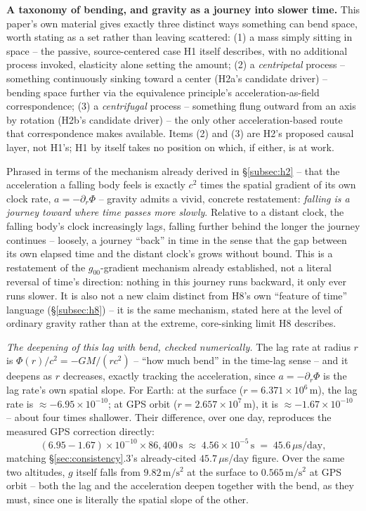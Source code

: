 \documentclass[12pt, a4paper]{article}
\begin{document}
\textbf{A taxonomy of bending, and gravity as a journey into slower
time.} This paper's own material gives exactly three distinct ways
something can bend space, worth stating as a set rather than leaving
scattered: (1) a mass simply sitting in space -- the passive,
source-centered case H1 itself describes, with no additional process
invoked, elasticity alone setting the amount; (2) a \emph{centripetal}
process -- something continuously sinking toward a center (H2a's
candidate driver) -- bending space further via the equivalence
principle's acceleration-as-field correspondence; (3) a
\emph{centrifugal} process -- something flung outward from an axis by
rotation (H2b's candidate driver) -- the only other
acceleration-based route that correspondence makes available. Items
(2) and (3) are H2's proposed causal layer, not H1's; H1 by itself
takes no position on which, if either, is at work.

Phrased in terms of the mechanism already derived in
\S\ref{subsec:h2} -- that the acceleration a falling body feels is
exactly $c^2$ times the spatial gradient of its own clock rate,
$a=-\partial_r\Phi$ -- gravity admits a vivid, concrete restatement:
\emph{falling is a journey toward where time passes more slowly}.
Relative to a distant clock, the falling body's clock increasingly
lags, falling further behind the longer the journey continues --
loosely, a journey ``back'' in time in the sense that the gap between
its own elapsed time and the distant clock's grows without bound.
This is a restatement of the $g_{00}$-gradient mechanism already
established, not a literal reversal of time's direction: nothing in
this journey runs backward, it only ever runs slower. It is also not
a new claim distinct from H8's own ``feature of time'' language
(\S\ref{subsec:h8}) -- it is the same mechanism, stated here at the
level of ordinary gravity rather than at the extreme, core-sinking
limit H8 describes.

\emph{The deepening of this lag with bend, checked numerically.} The
lag rate at radius $r$ is $\Phi(r)/c^2=-GM/(rc^2)$ -- ``how much bend''
in the time-lag sense -- and it deepens as $r$ decreases, exactly
tracking the acceleration, since $a=-\partial_r\Phi$ is the lag
rate's own spatial slope. For Earth: at the surface
($r=6.371\times10^6\,\mathrm{m}$), the lag rate is
$\approx-6.95\times10^{-10}$; at GPS orbit
($r=2.657\times10^7\,\mathrm{m}$), it is $\approx-1.67\times10^{-10}$
-- about four times shallower. Their difference, over one day,
reproduces the measured GPS correction directly:
\begin{equation}
(6.95-1.67)\times10^{-10}\times86{,}400\,\mathrm{s} \;\approx\; 4.56\times10^{-5}\,\mathrm{s} \;=\; 45.6\,\mu\mathrm{s/day},
\end{equation}
matching \S\ref{sec:consistency}.3's already-cited $45.7\,\mu$s/day
figure. Over the same two altitudes, $g$ itself falls from
$9.82\,\mathrm{m/s^2}$ at the surface to $0.565\,\mathrm{m/s^2}$ at GPS
orbit -- both the lag and the acceleration deepen together with the
bend, as they must, since one is literally the spatial slope of the
other.
\end{document}
